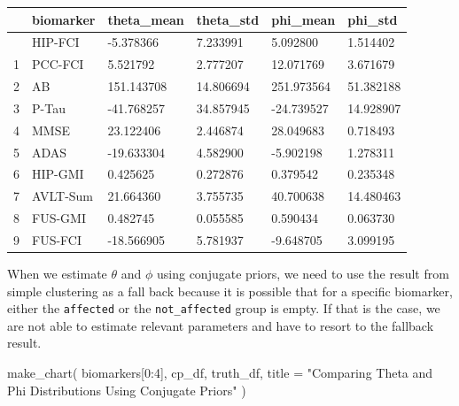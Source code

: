 \documentclass[
  letterpaper,
  DIV=11,
  numbers=noendperiod]{scrreprt}
\newenvironment{Shaded}{\begin{snugshade}}{\end{snugshade}}
\newcommand{\DecValTok}[1]{\textcolor[rgb]{0.68,0.00,0.00}{#1}}
\newcommand{\NormalTok}[1]{\textcolor[rgb]{0.00,0.23,0.31}{#1}}
\newcommand{\OperatorTok}[1]{\textcolor[rgb]{0.37,0.37,0.37}{#1}}
\newcommand{\StringTok}[1]{\textcolor[rgb]{0.13,0.47,0.30}{#1}}
\begin{document}
\begin{longtable}[]{@{}llllll@{}}
\toprule\noalign{}
& biomarker & theta\_mean & theta\_std & phi\_mean & phi\_std \\
\midrule\noalign{}
\endhead
\bottomrule\noalign{}
\endlastfoot
0 & HIP-FCI & -5.378366 & 7.233991 & 5.092800 & 1.514402 \\
1 & PCC-FCI & 5.521792 & 2.777207 & 12.071769 & 3.671679 \\
2 & AB & 151.143708 & 14.806694 & 251.973564 & 51.382188 \\
3 & P-Tau & -41.768257 & 34.857945 & -24.739527 & 14.928907 \\
4 & MMSE & 23.122406 & 2.446874 & 28.049683 & 0.718493 \\
5 & ADAS & -19.633304 & 4.582900 & -5.902198 & 1.278311 \\
6 & HIP-GMI & 0.425625 & 0.272876 & 0.379542 & 0.235348 \\
7 & AVLT-Sum & 21.664360 & 3.755735 & 40.700638 & 14.480463 \\
8 & FUS-GMI & 0.482745 & 0.055585 & 0.590434 & 0.063730 \\
9 & FUS-FCI & -18.566905 & 5.781937 & -9.648705 & 3.099195 \\
\end{longtable}

\begin{tcolorbox}[enhanced jigsaw, breakable, bottomtitle=1mm, toprule=.15mm, colframe=quarto-callout-note-color-frame, colbacktitle=quarto-callout-note-color!10!white, arc=.35mm, bottomrule=.15mm, left=2mm, opacitybacktitle=0.6, toptitle=1mm, colback=white, opacityback=0, title=\textcolor{quarto-callout-note-color}{\faInfo}\hspace{0.5em}{Note}, titlerule=0mm, rightrule=.15mm, leftrule=.75mm, coltitle=black]

When we estimate \(\theta\) and \(\phi\) using conjugate priors, we need
to use the result from simple clustering as a fall back because it is
possible that for a specific biomarker, either the \texttt{affected} or
the \texttt{not\_affected} group is empty. If that is the case, we are
not able to estimate relevant parameters and have to resort to the
fallback result.

\end{tcolorbox}

\begin{Shaded}
\begin{Highlighting}[]
\NormalTok{make\_chart(}
\NormalTok{    biomarkers[}\DecValTok{0}\NormalTok{:}\DecValTok{4}\NormalTok{], }
\NormalTok{    cp\_df, }
\NormalTok{    truth\_df, }
\NormalTok{    title }\OperatorTok{=} \StringTok{"Comparing Theta and Phi Distributions Using Conjugate Priors"}
\NormalTok{)}
\end{Highlighting}
\end{Shaded}
\end{document}

